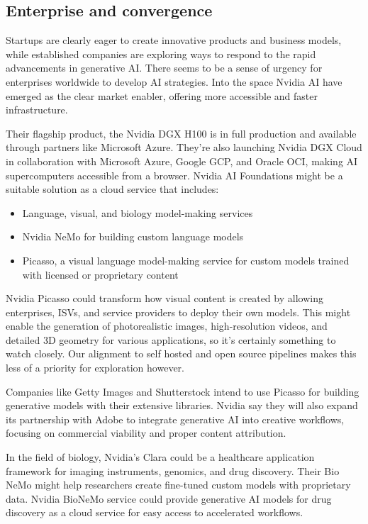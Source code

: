 \subsection{Enterprise and convergence}
Startups are clearly eager to create innovative products and business models, while established companies are exploring ways to respond to the rapid advancements in generative AI. There seems to be a sense of urgency for enterprises worldwide to develop AI strategies. Into the space Nvidia AI have emerged as the clear market enabler, offering more accessible and faster infrastructure.\par
Their flagship product, the Nvidia DGX H100 is in full production and available through partners like Microsoft Azure. They're also launching Nvidia DGX Cloud in collaboration with Microsoft Azure, Google GCP, and Oracle OCI, making AI supercomputers accessible from a browser. Nvidia AI Foundations might be a suitable solution as a cloud service that includes:
\begin{itemize}
\item Language, visual, and biology model-making services
\item Nvidia NeMo for building custom language models
\item Picasso, a visual language model-making service for custom models trained with licensed or proprietary content
\end{itemize} 
Nvidia Picasso could transform how visual content is created by allowing enterprises, ISVs, and service providers to deploy their own models. This might enable the generation of photorealistic images, high-resolution videos, and detailed 3D geometry for various applications, so it's certainly something to watch closely. Our alignment to self hosted and open source pipelines makes this less of a priority for exploration however.\par 
Companies like Getty Images and Shutterstock intend to use Picasso for building generative models with their extensive libraries. Nvidia say they will also expand its partnership with Adobe to integrate generative AI into creative workflows, focusing on commercial viability and proper content attribution.\par
In the field of biology, Nvidia's Clara could be a healthcare application framework for imaging instruments, genomics, and drug discovery. Their Bio NeMo might help researchers create fine-tuned custom models with proprietary data. Nvidia BioNeMo service could provide generative AI models for drug discovery as a cloud service for easy access to accelerated workflows.\par
